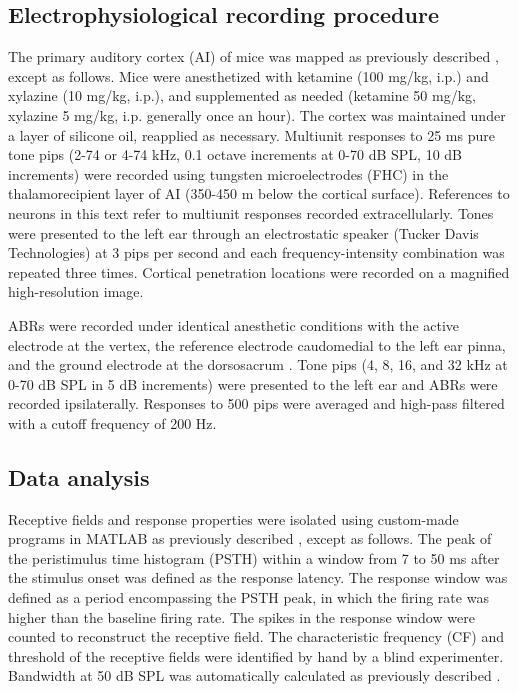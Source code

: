 \subsection{Electrophysiological recording procedure}

The primary auditory cortex (AI) of mice was mapped as previously described \cite{Kim2009}, except as follows. Mice were anesthetized with ketamine (100 mg/kg, i.p.) and xylazine (10 mg/kg, i.p.), and supplemented as needed (ketamine 50 mg/kg, xylazine 5 mg/kg, i.p. generally once an hour). The cortex was maintained under a layer of silicone oil, reapplied as necessary. Multiunit responses to 25 ms pure tone pips (2-74 or 4-74 kHz, 0.1 octave increments at 0-70 dB SPL, 10 dB increments) were recorded using tungsten microelectrodes (FHC) in the thalamorecipient layer of AI (350-450 \textmu{}m below the cortical surface). References to neurons in this text refer to multiunit responses recorded extracellularly. Tones were presented to the left ear through an electrostatic speaker (Tucker Davis Technologies) at 3 pips per second and each frequency-intensity combination was repeated three times. Cortical penetration locations were recorded on a magnified high-resolution image.

ABRs were recorded under identical anesthetic conditions with the active electrode at the vertex, the reference electrode caudomedial to the left ear pinna, and the ground electrode at the dorsosacrum \cite{OConnor1998, Popescu2010a}. Tone pips (4, 8, 16, and 32 kHz at 0-70 dB SPL in 5 dB increments) were presented to the left ear and ABRs were recorded ipsilaterally. Responses to 500 pips were averaged and high-pass filtered with a cutoff frequency of 200 Hz.

\subsection{Data analysis}

Receptive fields and response properties were isolated using custom-made programs in MATLAB as previously described \cite{Insanally2010}, except as follows. The peak of the peristimulus time histogram (PSTH) within a window from 7 to 50 ms after the stimulus onset was defined as the response latency. The response window was defined as a period encompassing the PSTH peak, in which the firing rate was higher than the baseline firing rate. The spikes in the response window were counted to reconstruct the receptive field. The characteristic frequency (CF) and threshold of the receptive fields were identified by hand by a blind experimenter. Bandwidth at 50 dB SPL was automatically calculated as previously described \cite{Insanally2010}.

